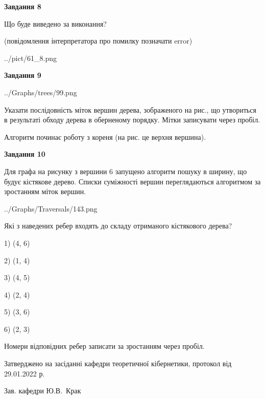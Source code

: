 \documentclass[12pt, ukrainian]{article}
\begin{document}
{\begin {large}
{\begin {center}\textbf{Завдання 8}\end {center}}\par
Що буде виведено за виконання?\par
 (повідомлення інтерпретатора про помилку позначати error)\par
\begin{center}
	{../pict/61_8.png}
\end{center}
\newpage

{\begin {center}\textbf{Завдання 9}\end {center}}\par

\begin{center}
	{../Graphs/trees/99.png}
\end{center}
Указати послідовність міток вершин дерева, зображеного на рис., що утвориться в результаті обходу дерева в оберненому порядку. Мітки записувати через пробіл.\par Алгоритм починає роботу з кореня (на рис. це верхня вершина).\par
\newpage

{\begin {center}\textbf{Завдання 10}\end {center}}\par
Для графа на рисунку з вершини 6 запущено алгоритм пошуку в ширину, що будує кістякове дерево. Списки суміжності вершин переглядаються алгоритмом за зростанням міток вершин.\par
\begin{center}
	{../Graphs/Traversals/143.png}
\end{center}
\par Які з наведених ребер входять до складу отриманого кістякового дерева?\par
1) (4, 6)\par
2) (1, 4)\par
3) (4, 5)\par
4) (2, 4)\par
5) (3, 6)\par
6) (2, 3)\par
{\vskip 15pt} Номери відповідних ребер записати за зростанням через пробіл.\par
\newpage


\end {large}
}
{\smallskip \begin {small} Затверджено на засіданні кафедри теоретичної кібернетики, протокол  від   29.01.2022 р.\par\smallskip\smallskip
{\parbox {6.5 cm}{Зав. кафедри \dotfill Ю.В.~Крак}} \end{small}}
\end{document}
